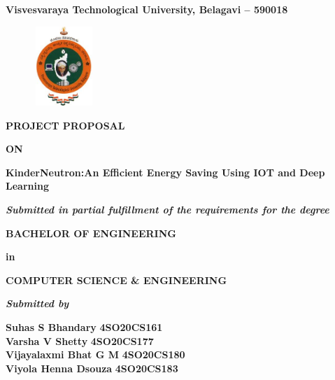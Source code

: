 \documentclass[12pt,a4paper]{report}
\begin{document}
\pagestyle{empty}
\begin{center}

{\large \textbf{Visvesvaraya Technological University, Belagavi – 590018}}
\begin{figure}[hbtp]
\centering
\includegraphics[width=2.3cm,height=3cm]{./pic/vtu}
\end{figure}

\textbf{PROJECT PROPOSAL}
\par
\textbf{ON}
\par
\vspace{6pt}
{\Large \textbf{KinderNeutron:An Efficient Energy Saving Using \break IOT and Deep Learning }}
\par
\vspace{12pt}
\par
\textit{\textbf{Submitted in partial fulfillment of the requirements for the degree }}
\par
\vspace{12pt}
\large \textbf{BACHELOR OF ENGINEERING }
\par
\textbf{in}
\par
\large \textbf{COMPUTER SCIENCE \& ENGINEERING}
\par
\vspace{12pt}
\textit{\textbf{Submitted by}}
\vspace{8pt}

\textbf{\large Suhas S Bhandary}\;\;\;\;\;\;\;\;\;\;\;\;\;\;\;\;\;\;\;\;\;\;\;\;\; \textbf{\large 4SO20CS161}\\ \vspace{3pt} 
\textbf{\large Varsha V Shetty}\;\;\;\;\;\;\;\;\;\;\;\;\;\;\;\;\;\;\;\;\;\;\;\;\;\;\;\:\: \textbf{\large 4SO20CS177}\\ \vspace{3pt}
\textbf{\large Vijayalaxmi Bhat G M}\;\;\;\;\;\;\;\;\;\;\;\;\;\;\;\;\; \textbf{\large 4SO20CS180}\\ \vspace{3pt}
\textbf{\large Viyola Henna Dsouza}\;\;\;\;\;\;\;\;\;\;\;\;\;\;\;\;\;\;\;\:  \textbf{\large 4SO20CS183}\\ \vspace{3pt}


\end{center}
\end{document}

